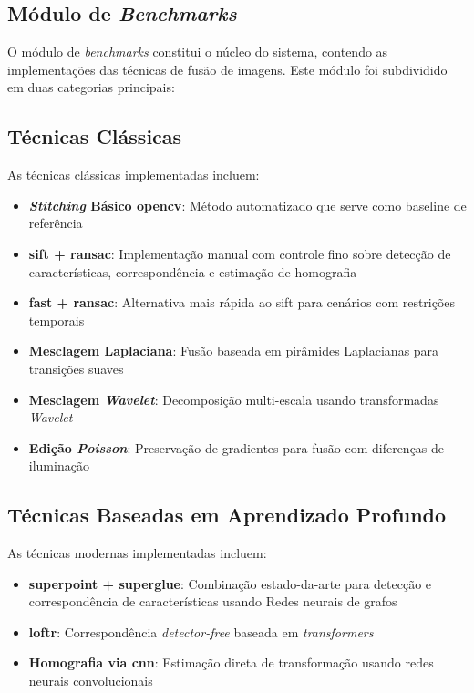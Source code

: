 \subsection{Módulo de \textit{Benchmarks}}

O módulo de \textit{benchmarks} constitui o núcleo do sistema, contendo as implementações das técnicas de fusão de imagens. Este módulo foi subdividido em duas categorias principais:

\subsection*{Técnicas Clássicas}

As técnicas clássicas implementadas incluem:

\begin{itemize}
    \item \textbf{\textit{Stitching} Básico \gls{opencv}}: Método automatizado que serve como baseline de referência
    \item \textbf{\gls{sift} + \gls{ransac}}: Implementação manual com controle fino sobre detecção de características, correspondência e estimação de homografia
    \item \textbf{\gls{fast} + \gls{ransac}}: Alternativa mais rápida ao \gls{sift} para cenários com restrições temporais
    \item \textbf{Mesclagem Laplaciana}: Fusão baseada em pirâmides Laplacianas para transições suaves
    \item \textbf{Mesclagem \textit{Wavelet}}: Decomposição multi-escala usando transformadas \textit{Wavelet}
    \item \textbf{Edição \textit{Poisson}}: Preservação de gradientes para fusão com diferenças de iluminação
\end{itemize}

\subsection*{Técnicas Baseadas em Aprendizado Profundo}

As técnicas modernas implementadas incluem:

\begin{itemize}
    \item \textbf{\gls{superpoint} + \gls{superglue}}: Combinação estado-da-arte para detecção e correspondência de características usando Redes neurais de grafos
    \item \textbf{\gls{loftr}}: Correspondência \textit{detector-free} baseada em \textit{transformers}
    \item \textbf{Homografia via \gls{cnn}}: Estimação direta de transformação usando redes neurais convolucionais
\end{itemize}

